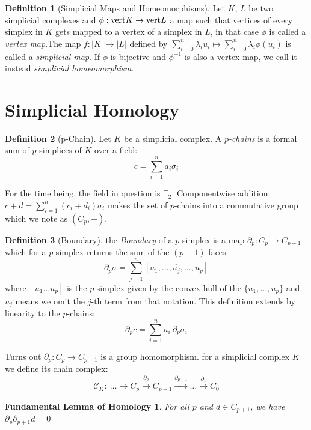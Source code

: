 \documentclass{article}
\newcommand{\inv}{^{-1}}
\newcommand{\vertices}{\textmd{vert}}
\theoremstyle{plain}
\newtheorem*{FLH}{Fundamental Lemma of Homology}
\theoremstyle{definition}
\newtheorem{definition}{Definition}[section]
\theoremstyle{remark}
\begin{document}
	\begin{definition}[Simplicial Maps and Homeomorphisms]
		Let $K$, $L$ be two simplicial complexes and $ \phi: \vertices K \to \vertices L $ a map such that vertices of every simplex in $K$ gets mapped to a vertex of a simplex in $L$, in that case $\phi$ is called a \emph{vertex map}.The map $f: |K| \to |L|$ defined by $ \sum_{i=0}^n \lambda_i u_i \mapsto \sum_{i=0}^n \lambda_i \phi(u_i) $ is called a \emph{simplicial map}. If $ \phi $ is bijective and $ \phi\inv $ is also a vertex map, we call it instead \emph{simplicial homeomorphism}.
	\end{definition}

	\section{Simplicial Homology}
	\begin{definition}[p-Chain]
		Let $K$ be a simplicial complex. A \emph{$ p $-chains} is a formal sum of $p$-simplices of $K$ over a field: \[ c = \sum_{i=1}^{n} a_i \sigma_i \]
	\end{definition}
	For the time being, the field in question is $ \mathbb{F}_2 $. Componentwise addition: $ c + d = \sum_{i=1}^n (c_i + d_i) \sigma_i $ makes the set of $p$-chains into a commutative group which we note as $ (C_p, +) $.
\begin{definition}[Boundary]
	the \emph{Boundary} of a $ p $-simplex is a map $ \partial_p : C_p \to C_{p-1} $ which for a $p$-simplex returns the sum of the $ (p-1) $-faces: \[ \partial_p \sigma = \sum_{j=1}^n [u_1, \dots , \hat{u_j} , \dots , u_p] \]
	where $[ u_1 \dots u_p ]$ is the $p$-simplex given by the convex hull of the $\{u_1, \dots , u_p\}$ and $\hat{u}_j$ means we omit the $j$-th term from that notation.
	This definition extends by linearity to the $p$-chains: \[ \partial_p c = \sum_{i=1}^{n} a_i \ \partial_p\sigma_i  \]
\end{definition}

Turns out $ \partial_p : C_p \to C_{p-1} $ is a group homomorphism. for a simplicial complex $K$ we define its chain complex:
\[\mathcal{C}_K: \ \dots \longrightarrow C_p \stackrel{\partial_p}{\longrightarrow} C_{p-1} \stackrel{\partial_{p-1}}{\longrightarrow} \dots \stackrel{\partial_1}{\longrightarrow} C_0 \]

\begin{FLH}
	For all $p$ and $d \in C_{p+1}$, we have $ \partial_{p} \partial_{p+1} d = 0$
\end{FLH}
\end{document}
